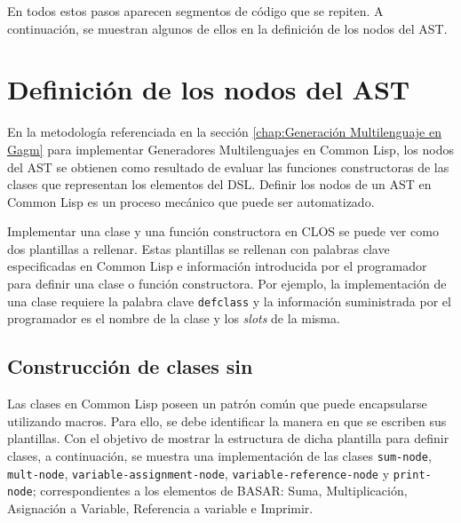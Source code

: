 En todos estos pasos aparecen segmentos de código que se repiten. A continuación, se muestran algunos de ellos en la definición de los nodos del AST.

\section{Definición de los nodos del AST}
\label{AST en GAGM}
En la metodología referenciada en la sección \ref{chap:Generación Multilenguaje en Gagm} para implementar Generadores Multilenguajes en Common Lisp, los nodos del AST se obtienen como resultado de evaluar las funciones constructoras de las clases que representan los elementos del DSL. Definir los nodos de un AST en Common Lisp es un proceso mecánico que puede ser automatizado.

Implementar una clase y una función constructora en CLOS se puede ver como dos plantillas  a rellenar. Estas plantillas se rellenan con palabras clave especificadas en Common Lisp e información introducida por el programador para definir una clase o función constructora.  Por ejemplo, la implementación de una clase requiere la palabra clave \texttt{defclass} y la información suministrada por el programador es el nombre de la clase y los \textit{slots} de la misma.

\subsection{Construcción de clases sin \gagm}
\label{patron clases}
Las clases en Common Lisp poseen un patrón común que puede encapsularse utilizando macros. Para ello, se debe identificar la manera en que se escriben sus plantillas. Con el objetivo de mostrar la estructura de dicha plantilla para definir clases, a continuación, se muestra una implementación de las clases \texttt{sum-node}, \texttt{mult-node}, \texttt{variable-assignment-node}, \texttt{variable-reference-node} y \texttt{print-node}; correspondientes a los elementos de BASAR: Suma, Multiplicación, Asignación a Variable, Referencia a variable e Imprimir.


